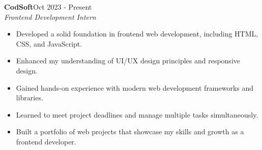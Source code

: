 \documentclass[a4paper]{article}
\begin{document}
{\textbf{CodSoft}}\hfill Oct 2023 - Present \\
 {\textit{Frontend Development Intern }}  \
\vspace{-2.5mm}
\begin{itemize} 
\item Developed a solid foundation in frontend web development, including HTML, CSS, and JavaScript.
\vspace{-2mm}
\item Enhanced my understanding of UI/UX design principles and responsive design.
\vspace{-2mm}
\item Gained hands-on experience with modern web development frameworks and libraries.
\vspace{-2mm}
\item Learned to meet project deadlines and manage multiple tasks simultaneously.
\vspace{-2mm}
\item Built a portfolio of web projects that showcase my skills and growth as a frontend developer.
\end{itemize}

\end{document}

